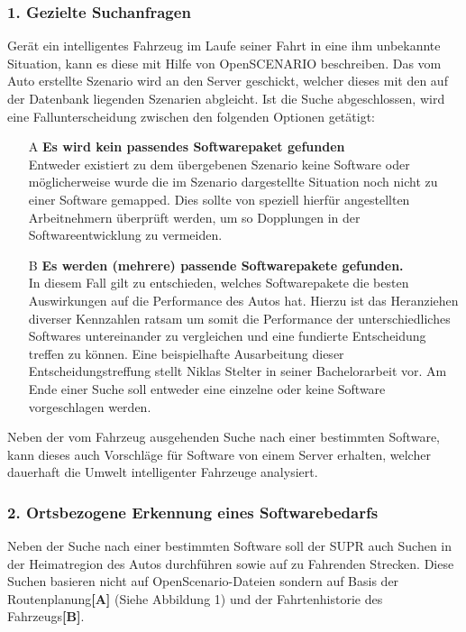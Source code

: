 \subsubsection{1. Gezielte Suchanfragen}
Gerät ein intelligentes Fahrzeug im Laufe seiner Fahrt in eine ihm unbekannte Situation, kann es diese mit Hilfe von OpenSCENARIO beschreiben. Das vom Auto erstellte Szenario wird an den Server geschickt, welcher dieses mit den auf der Datenbank liegenden Szenarien abgleicht. Ist die Suche abgeschlossen, wird eine Fallunterscheidung zwischen den folgenden Optionen getätigt:
\begin{itemize}
	\item[A] \textbf{Es wird \textbf{kein} passendes Softwarepaket gefunden}\\
	Entweder existiert zu dem übergebenen Szenario keine Software oder möglicherweise wurde die im Szenario dargestellte Situation noch nicht zu einer Software gemapped. Dies sollte von speziell hierfür angestellten Arbeitnehmern überprüft werden, um so Dopplungen in der Softwareentwicklung zu vermeiden. 
	\item[B] \textbf{Es werden (mehrere) passende Softwarepakete gefunden.}\\
	In diesem Fall gilt zu entschieden, welches Softwarepakete die besten Auswirkungen auf die Performance des Autos hat. 
	Hierzu ist das Heranziehen diverser Kennzahlen ratsam um somit die Performance der unterschiedliches Softwares untereinander zu vergleichen und eine fundierte Entscheidung treffen zu können. Eine beispielhafte Ausarbeitung dieser Entscheidungstreffung stellt Niklas Stelter in seiner Bachelorarbeit vor\cite{stelter}. Am Ende einer Suche soll entweder eine einzelne oder keine Software vorgeschlagen werden.
\end{itemize}
Neben der vom Fahrzeug ausgehenden Suche nach einer bestimmten Software, kann dieses auch Vorschläge für Software von einem Server erhalten, welcher dauerhaft die Umwelt intelligenter Fahrzeuge analysiert.

\subsubsection{2. Ortsbezogene Erkennung eines Softwarebedarfs}
Neben der Suche nach einer bestimmten Software soll der SUPR auch Suchen in der Heimatregion des Autos durchführen sowie auf zu Fahrenden Strecken. Diese Suchen basieren nicht auf OpenScenario-Dateien sondern auf Basis der Routenplanung\textbf{[A]} (Siehe Abbildung 1) und der Fahrtenhistorie des Fahrzeugs\textbf{[B]}.\\

